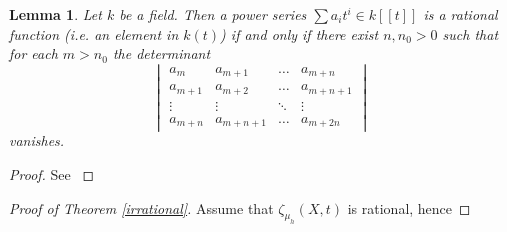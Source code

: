 \documentclass[11pt, a4paper, german]{article}
\theoremstyle{plain}
\newtheorem{lemma}[theorem]{Lemma}
\theoremstyle{definition}
\begin{document}
\begin{lemma}
    Let $k$ be a field. Then a power series $\sum a_it^i \in k[[t]]$  is a rational function (i.e. an element in $k(t)$) if and only if
    there exist $n, n_0 > 0$ such that for each $m > n_0$ the determinant
    \[
        \begin{vmatrix}
            a_m     & a_{m+1} & \dots & a_{m+n} \\
            a_{m+1} & a_{m+2} & \dots & a_{m+n+1} \\
            \vdots  & \vdots  & \ddots & \vdots \\
            a_{m+n} & a_{m+n+1} & \dots & a_{m+2n}
        \end{vmatrix}
    \]
    vanishes.
\end{lemma}
\begin{proof}
    See \cite[Section 5.3, Lem. 1]{MR0241425}
\end{proof}

\begin{proof}[Proof of Theorem \ref{irrational}]
    Assume that $\zeta_{\mu_h}(X,t)$ is rational, hence 
\end{proof}




{}

\end{document}
